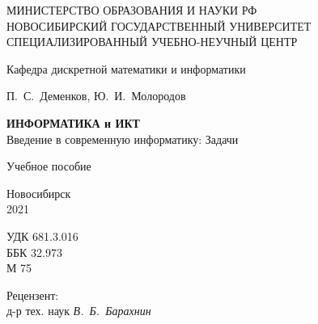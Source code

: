 
\thispagestyle{empty}

\begin{center}
МИНИСТЕРСТВО ОБРАЗОВАНИЯ И НАУКИ РФ\\[2mm]
НОВОСИБИРСКИЙ   ГОСУДАРСТВЕННЫЙ УНИВЕРСИТЕТ\\[2mm]
 СПЕЦИАЛИЗИРОВАННЫЙ УЧЕБНО-НЕУЧНЫЙ ЦЕНТР
\end{center}

\vspace{0.46cm}
\begin{center}
{\Large Кафедра дискретной математики и информатики}
\end{center}

\vspace{3cm}
\begin{center}
{\LARGE  П.~С.~Деменков, Ю.~И.~Молородов}
\end{center}

\vspace{1cm}

\begin{center}
{\Large \bf ИНФОРМАТИКА и ИКТ}\\
{\large Введение в современную информатику: Задачи}
\end{center}

\vspace {1mm}


\begin{center}
Учебное пособие\\

\vspace*{42mm}

Новосибирск\\2021
\end{center}

\newpage

\thispagestyle{empty}

\noindent
УДК 681.3.016 \\
ББК 32.973\\
М 75

\begin{center}
Рецензент:\\  д-р тех. наук {\it В.~Б.~Барахнин}\\
\end{center}

